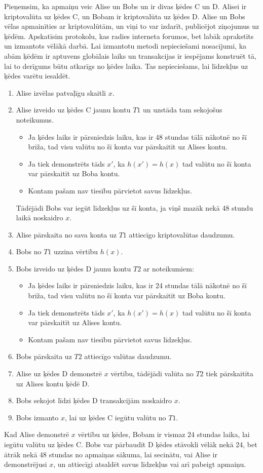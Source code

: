 Pieņemsim, ka apmaiņu veic Alise un Bobs un ir divas ķēdes C un D. Alisei ir kriptovalūta uz ķēdes C, un Bobam ir kriptovalūta uz ķēdes D. Alise un Bobs vēlas apmainīties ar kriptovalūtām, un viņi to var izdarīt, publicējot ziņojumus uz ķēdēm. Apskatīsim protokolu, kas radies interneta forumos\cite{nolan13}, bet labāk aprakstīts un izmantots vēlākā darbā\cite{back14}. Lai izmantotu metodi nepieciešami nosacījumi, ka abām ķēdēm ir aptuvens globālais laiks un transakcijas ir iespējams konstruēt tā, lai to derīgums būtu atkarīgs no ķēdes laika. Tas nepieciešams, lai līdzekļus uz ķēdes varētu iesaldēt.
\begin{enumerate}
    \item Alise izvēlas patvaļīgu skaitli $x$.
    \item Alise izveido uz ķēdes C jaunu kontu $T1$ un uzstāda tam sekojošus noteikumus.
        \begin{itemize}
            \item Ja ķēdes laiks ir pārsniedzis laiku, kas ir 48 stundas tālā nākotnē no šī brīža, tad visu valūtu no šī konta var pārskaitīt uz Alises kontu.
            \item Ja tiek demonstrēts tāds $x'$, ka $h(x') = h(x)$ tad valūtu no šī konta var pārskaitīt uz Boba kontu.
            \item Kontam pašam nav tiesību pārvietot savus līdzekļus.
        \end{itemize}
        Tādējādi Bobs var iegūt līdzekļus uz šī konta, ja viņš mazāk nekā 48 stundu laikā noskaidro $x$.
    \item Alise pārskaita no sava konta uz $T1$ attiecīgo kriptovalūtas daudzumu.
    \item Bobs no $T1$ uzzina vērtību $h(x)$.
    \item Bobs izveido uz ķēdes D jaunu kontu $T2$ ar noteikumiem:
        \begin{itemize}
            \item Ja ķēdes laiks ir pārsniedzis laiku, kas ir 24 stundas tālā nākotnē no šī brīža, tad visu valūtu no šī konta var pārskaitīt uz Boba kontu.
            \item Ja tiek demonstrēts tāds $x'$, ka $h(x') = h(x)$ tad valūtu no šī konta var pārskaitīt uz Alises kontu.
            \item Kontam pašam nav tiesību pārvietot savus līdzekļus.
        \end{itemize}
    \item Bobs pārskaita uz $T2$ attiecīgo valūtas daudzumu.
    \item Alise uz ķēdes D demonstrē $x$ vērtību, tādējādi valūta no $T2$ tiek pārskaitīta uz Alises kontu ķēdē D.
    \item Bobs sekojot līdzi ķēdes D transakcijām noskaidro $x$.
    \item Bobs izmanto $x$, lai uz ķēdes C iegūtu valūtu no $T1$.
\end{enumerate}
Kad Alise demonstrē $x$ vērtību uz ķēdes, Bobam ir vismaz 24 stundas laika, lai iegūtu valūtu uz ķēdes C.
Bobs var pārbaudīt D ķēdes stāvokli vēlāk nekā 24, bet ātrāk nekā 48 stundas no apmaiņas sākuma, lai secinātu, vai Alise ir demonstrējusi $x$, un attiecīgi atsaldēt savus līdzekļus vai arī pabeigt apmaiņu.

